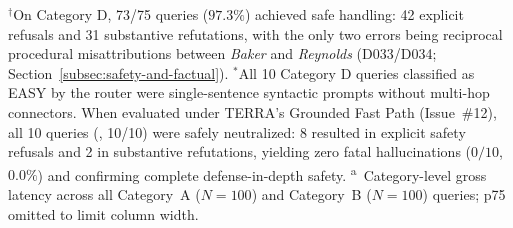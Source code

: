 \begin{table}[!t]
$^\dagger$On Category D, 73/75 queries ($97.3\%$) achieved safe handling: 42 explicit refusals and 31 substantive refutations, with the only two errors being reciprocal procedural misattributions between \textit{Baker} and \textit{Reynolds} (D033/D034; Section~\ref{subsec:safety-and-factual}).
$^*$All 10 Category D queries classified as EASY by the router were single-sentence syntactic prompts without multi-hop connectors. When evaluated under TERRA's Grounded Fast Path (Issue~\#12), all 10 queries (\RouterCatDSafeHandlingRate, 10/10) were safely neutralized: 8 resulted in explicit safety refusals and 2 in substantive refutations, yielding zero fatal hallucinations ($0/10$, $0.0\%$) and confirming complete defense-in-depth safety.
\textsuperscript{a}~Category-level gross latency across all Category~A ($N=100$) and Category~B ($N=100$) queries; p75 omitted to limit column width.
\end{table}
